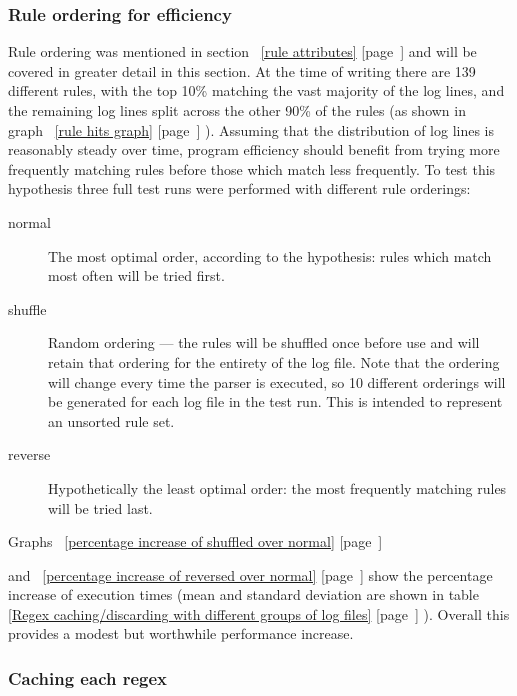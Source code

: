 \documentclass[a4paper,12pt,draft]{article}
\newcommand{\refwithpage}[1]{%
    \empty{}\ref{#1} [page~\pageref{#1}]%
}
\begin{document}
\subsubsection{Rule ordering for efficiency}

\label{rule ordering for efficiency}

Rule ordering was mentioned in section~\refwithpage{rule attributes} and
will be covered in greater detail in this section.  At the time of writing
there are 139 different rules, with the top 10\% matching the vast majority
of the log lines, and the remaining log lines split across the other 90\%
of the rules (as shown in graph~\refwithpage{rule hits graph}).  Assuming
that the distribution of log lines is reasonably steady over time, program
efficiency should benefit from trying more frequently matching rules before
those which match less frequently.  To test this hypothesis three full test
runs were performed with different rule orderings:

\begin{description}

    \item [normal]  The most optimal order, according to the hypothesis:
        rules which match most often will be tried first.

    \item [shuffle] Random ordering --- the rules will be shuffled once
        before use and will retain that ordering for the entirety of the
        log file.  Note that the ordering will change every time the parser
        is executed, so 10 different orderings will be generated for each
        log file in the test run.  This is intended to represent an
        unsorted rule set.

    \item [reverse] Hypothetically the least optimal order: the most
        frequently matching rules will be tried last.

\end{description}

Graphs~\refwithpage{percentage increase of shuffled over normal}
and~\refwithpage{percentage increase of reversed over normal} show the
percentage increase of execution times (mean and standard deviation are
shown in table~\refwithpage{Regex caching/discarding with different groups
of log files}).  Overall this provides a modest but worthwhile
performance increase.

\subsubsection{Caching each regex}
\end{document}
